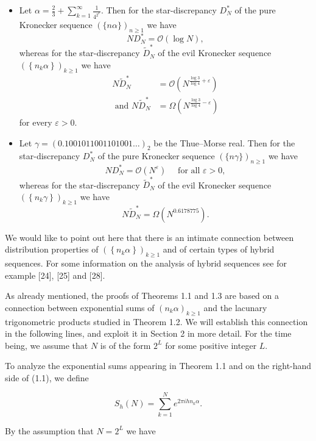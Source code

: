 \documentclass[10pt]{article}
\newcommand{\1}{\mathbf{1}}
\begin{document}
\begin{itemize}
  \item[(a)] Let $\alpha=\frac{2}{3}+\sum_{k=1}^{\infty} \frac{1}{4^{2^{k}}}$. Then for the star-discrepancy $D_{N}^{*}$ of the pure Kronecker sequence $(\{n \alpha\})_{n \geqslant 1}$ we have
$$
N D_{N}^{*}=\mathcal{O}(\log N),
$$
whereas for the star-discrepancy $\widetilde{D}_{N}^{*}$ of the evil Kronecker sequence $\left(\left\{n_{k} \alpha\right\}\right)_{k \geqslant 1}$ we have
$$
\begin{aligned}
N \widetilde{D}_{N}^{*} & =\mathcal{O}\left(N^{\frac{\log 3}{\log 4}+\varepsilon}\right) \\
\text{ and } N \widetilde{D}_{N}^{*} & =\Omega\left(N^{\frac{\log 3}{\log 4}-\varepsilon}\right)
\end{aligned}
$$
for every $\varepsilon>0$.
  \item[(b)] Let $\gamma=(0.1001011001101001\ldots)_2$ be the Thue--Morse real. Then for the star-discrepancy $D_{N}^{*}$ of the pure Kronecker sequence $(\{n \gamma\})_{n \geqslant 1}$ we have
$$
N D_{N}^{*}=\mathcal{O}\left(N^{\varepsilon}\right) \quad \text { for all } \varepsilon>0,
$$
whereas for the star-discrepancy $\widetilde{D}_{N}^{*}$ of the evil Kronecker sequence $\left(\left\{n_{k} \gamma\right\}\right)_{k \geqslant 1}$ we have
$$
N \widetilde{D}_{N}^{*}=\Omega\left(N^{0.6178775}\right) .
$$
\end{itemize}

We would like to point out here that there is an intimate connection between distribution properties of $\left(\left\{n_{k} \alpha\right\}\right)_{k \geqslant 1}$ and of certain types of hybrid\\[0pt]
sequences. For some information on the analysis of hybrid sequences see for example [24], [25] and [28].

As already mentioned, the proofs of Theorems 1.1 and 1.3 are based on a connection between exponential sums of $\left(n_{k} \alpha\right)_{k \geqslant 1}$ and the lacunary trigonometric products studied in Theorem 1.2. We will establish this connection in the following lines, and exploit it in Section 2 in more detail. For the time being, we assume that $N$ is of the form $2^{L}$ for some positive integer $L$.

To analyze the exponential sums appearing in Theorem 1.1 and on the right-hand side of (1.1), we define

$$
S_{h}(N)=\sum_{k=1}^{N} e^{2 \pi i h n_{k} \alpha} .
$$

By the assumption that $N=2^{L}$ we have
\end{document}
